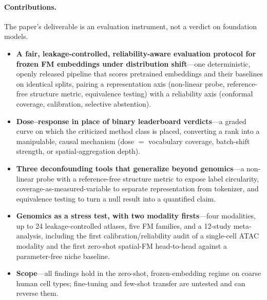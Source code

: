 \documentclass[11pt]{article}
\begin{document}
\paragraph{Contributions.} The paper's deliverable is an evaluation instrument, not a verdict on foundation models.
\begin{itemize}\itemsep2pt \parskip0pt 
\item \textbf{A fair, leakage-controlled, reliability-aware evaluation protocol for frozen FM embeddings under distribution shift}---one deterministic, openly released pipeline that scores pretrained embeddings and their baselines on identical splits, pairing a representation axis (non-linear probe, reference-free structure metric, equivalence testing) with a reliability axis (conformal coverage, calibration, selective abstention).
\item \textbf{Dose--response in place of binary leaderboard verdicts}---a graded curve on which the criticized method class is placed, converting a rank into a manipulable, causal mechanism (dose $=$ vocabulary coverage, batch-shift strength, or spatial-aggregation depth).
\item \textbf{Three deconfounding tools that generalize beyond genomics}---a non-linear probe with a reference-free structure metric to expose label circularity, coverage-as-measured-variable to separate representation from tokenizer, and equivalence testing to turn a null result into a quantified claim.
\item \textbf{Genomics as a stress test, with two modality firsts}---four modalities, up to 24 leakage-controlled atlases, five FM families, and a 12-study meta-analysis, including the first calibration/reliability audit of a single-cell ATAC modality and the first zero-shot spatial-FM head-to-head against a parameter-free niche baseline.
\item \textbf{Scope}---all findings hold in the zero-shot, frozen-embedding regime on coarse human cell types; fine-tuning and few-shot transfer are untested and can reverse them.
\end{itemize}
\end{document}
